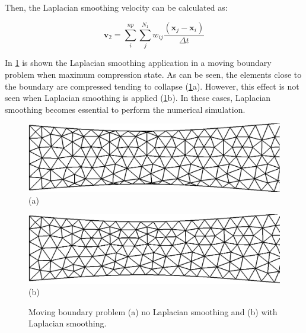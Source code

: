\medskip
\noindent
Then, the Laplacian smoothing velocity can be calculated as:


\begin{equation}
\textbf{v}_{2}
= \sum_{i}^{np} \sum_{j}^{N_1} w_{ij}
\frac{\left( \textbf{x}_{j} - \textbf{x}_{i} \right)}{\Delta t}
\end{equation}

\medskip
In \ref{laplacian smoothing fig} is shown 
the Laplacian smoothing application in a moving boundary problem
when maximum compression state.
As can be seen, the elements close to the boundary are compressed 
tending to collapse (\ref{laplacian smoothing fig}a). 
However, this effect is not seen when 
Laplacian smoothing is applied (\ref{laplacian smoothing fig}b). 
In these cases, Laplacian smoothing becomes essential 
to perform the numerical simulation.

\begin{figure}[H]
     \centering
     \begin{minipage}{.5\linewidth}
      \centering
      \includegraphics[scale=0.2]{./02_chaps/cap_numerico/figure/noLaplacian.png}\\
      (a)
     \end{minipage}%
     \begin{minipage}{.5\linewidth}
      \centering
      \includegraphics[scale=0.2]{./02_chaps/cap_numerico/figure/withLaplacian.png}\\
      (b)
     \end{minipage}
     \medskip
     \caption{Moving boundary problem
     (a) no Laplacian smoothing and
     (b) with Laplacian smoothing.
}
     \label{laplacian smoothing fig}
\end{figure}
